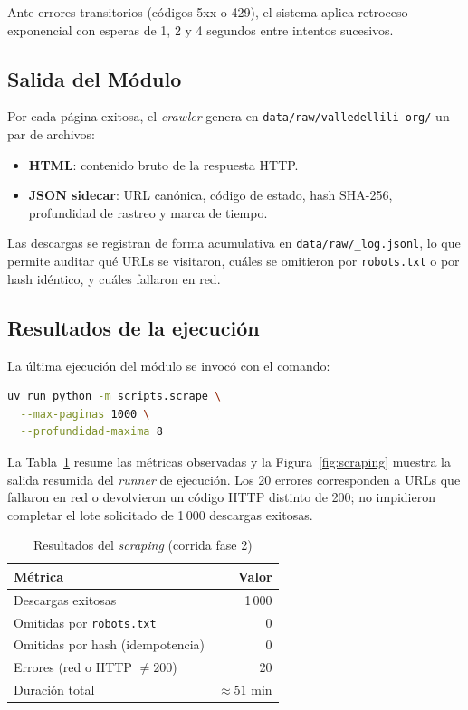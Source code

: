 \documentclass[conference]{IEEEtran}
\newcommand{\code}[1]{\texttt{\small #1}}
\begin{document}
Ante errores transitorios (códigos 5xx o 429), el sistema aplica retroceso
exponencial con esperas de 1, 2 y 4 segundos entre intentos sucesivos.

\subsection{Salida del Módulo}

Por cada página exitosa, el \textit{crawler} genera en
\code{data/raw/valledellili-org/} un par de archivos:

\begin{itemize}
    \item \textbf{HTML}: contenido bruto de la respuesta HTTP.
    \item \textbf{JSON sidecar}: URL canónica, código de estado, hash SHA-256,
          profundidad de rastreo y marca de tiempo.
\end{itemize}

Las descargas se registran de forma acumulativa en
\code{data/raw/\_log.jsonl}, lo que permite auditar qué URLs se visitaron,
cuáles se omitieron por \code{robots.txt} o por hash idéntico, y cuáles
fallaron en red.

\subsection{Resultados de la ejecución}
\label{subsec:scraping_resultados}

La última ejecución del módulo se invocó con el comando:

\begin{lstlisting}[language=bash, caption={Comando de ejecución del
\textit{crawler} en la fase 2}, label={lst:scrape_cmd}]
uv run python -m scripts.scrape \
  --max-paginas 1000 \
  --profundidad-maxima 8
\end{lstlisting}

La Tabla~\ref{tab:scraping_resultados} resume las métricas observadas y
la Figura~\ref{fig:scraping} muestra la salida resumida del
\textit{runner} de ejecución. Los 20 errores corresponden a URLs que
fallaron en red o devolvieron un código HTTP distinto de 200; no
impidieron completar el lote solicitado de 1\,000 descargas exitosas.

\begin{table}[ht]
\centering
\caption{Resultados del \textit{scraping} (corrida fase 2)}
\label{tab:scraping_resultados}
\setlength{\tabcolsep}{4pt}
\begin{tabular}{@{}lr@{}}
\toprule
\textbf{Métrica} & \textbf{Valor} \\
\midrule
Descargas exitosas               & 1\,000 \\
Omitidas por \code{robots.txt}   & 0      \\
Omitidas por hash (idempotencia) & 0      \\
Errores (red o HTTP $\neq 200$)  & 20     \\
Duración total                   & $\approx 51$ min \\
\bottomrule
\end{tabular}
\end{table}
\end{document}
